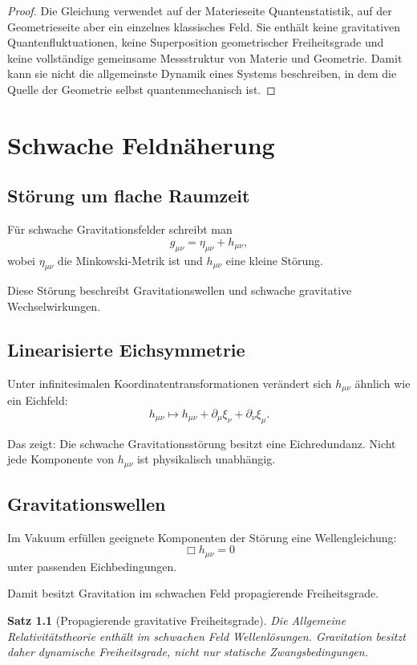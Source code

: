 \documentclass[11pt,a4paper,oneside]{book}
\theoremstyle{definition}
\theoremstyle{plain}
\newtheorem{satz}[definition]{Satz}
\theoremstyle{remark}
\begin{document}
\begin{proof}
Die Gleichung verwendet auf der Materieseite Quantenstatistik, auf der Geometrieseite aber ein einzelnes klassisches Feld. Sie enthält keine gravitativen Quantenfluktuationen, keine Superposition geometrischer Freiheitsgrade und keine vollständige gemeinsame Messstruktur von Materie und Geometrie. Damit kann sie nicht die allgemeinste Dynamik eines Systems beschreiben, in dem die Quelle der Geometrie selbst quantenmechanisch ist.
\end{proof}

\chapter{Schwache Feldnäherung}
\section{Störung um flache Raumzeit}
Für schwache Gravitationsfelder schreibt man
\[
g_{\mu\nu}=\eta_{\mu\nu}+h_{\mu\nu},
\]
wobei $\eta_{\mu\nu}$ die Minkowski-Metrik ist und $h_{\mu\nu}$ eine kleine Störung.

Diese Störung beschreibt Gravitationswellen und schwache gravitative Wechselwirkungen.

\section{Linearisierte Eichsymmetrie}
Unter infinitesimalen Koordinatentransformationen verändert sich $h_{\mu\nu}$ ähnlich wie ein Eichfeld:
\[
h_{\mu\nu}\mapsto h_{\mu\nu}+\partial_\mu\xi_\nu+\partial_\nu\xi_\mu.
\]

Das zeigt: Die schwache Gravitationsstörung besitzt eine Eichredundanz. Nicht jede Komponente von $h_{\mu\nu}$ ist physikalisch unabhängig.

\section{Gravitationswellen}
Im Vakuum erfüllen geeignete Komponenten der Störung eine Wellengleichung:
\[
\Box h_{\mu\nu}=0
\]
unter passenden Eichbedingungen.

Damit besitzt Gravitation im schwachen Feld propagierende Freiheitsgrade.

\begin{satz}[Propagierende gravitative Freiheitsgrade]
Die Allgemeine Relativitätstheorie enthält im schwachen Feld Wellenlösungen. Gravitation besitzt daher dynamische Freiheitsgrade, nicht nur statische Zwangsbedingungen.
\end{satz}
\end{document}
